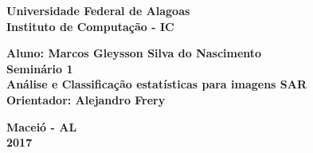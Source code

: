 \documentclass[a4paper, 12pt, english]{article}
\begin{document}
\begin{titlepage}
\begin{center}
\textbf{\LARGE Universidade Federal de Alagoas}\\[0.5cm] 
\textbf{\large Instituto de Computação - IC}\\[0.2cm]
\vspace{20pt}

\par
\vspace{20pt}
\vspace{20pt}
\vspace{20pt}
\vspace{20pt}
\vspace{20pt}
\vspace{20pt}
\vspace{20pt}
\vspace{20pt}
\vspace{20pt}
\textbf{\Large Aluno: Marcos Gleysson Silva do Nascimento}\\ 
\vspace{15pt}
\myrule[1pt][7pt]
\textbf{\LARGE  Seminário 1}\\
\vspace{15pt}
\textbf{\large Análise e Classificação estatísticas para imagens SAR }\\
\myrule[1pt][7pt]
\vspace{25pt}
\textbf{\large Orientador: Alejandro Frery}\\


\vspace{45pt}
\end{center}

\par
\vfill
\begin{center}
\textbf{Maceió - AL}\\
\textbf{2017}
\end{center}

\end{titlepage}


\end{document}
